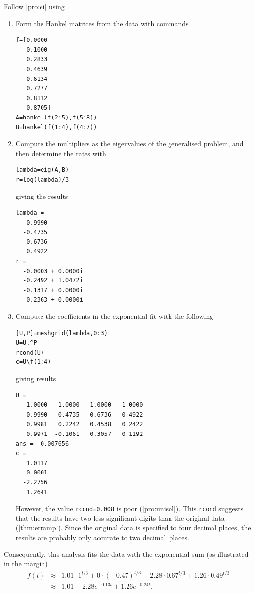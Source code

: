 \begin{draft}
\begin{example}
\begin{solution} 
Follow \autoref{pro:ei} using \script. 
\begin{enumerate}
\item Form the Hankel matrices from the data with commands
\begin{verbatim}
f=[0.0000
   0.1000
   0.2833
   0.4639
   0.6134
   0.7277
   0.8112
   0.8705]
A=hankel(f(2:5),f(5:8))
B=hankel(f(1:4),f(4:7))
\end{verbatim}
\setbox\ajrqrbox\hbox{}%
\marginpar{\usebox{\ajrqrbox}}%

\item Compute the multipliers as the eigenvalues of the generalised problem, and then determine the rates with
\begin{verbatim}
lambda=eig(A,B)
r=log(lambda)/3
\end{verbatim}
giving the results
\begin{verbatim}
lambda =
   0.9990
  -0.4735
   0.6736
   0.4922
r =
  -0.0003 + 0.0000i
  -0.2492 + 1.0472i
  -0.1317 + 0.0000i
  -0.2363 + 0.0000i
\end{verbatim}

\item Compute the coefficients in the exponential fit with the following
\begin{verbatim}
[U,P]=meshgrid(lambda,0:3)
U=U.^P
rcond(U)
c=U\f(1:4)
\end{verbatim}
giving results
\begin{verbatim}
U =
   1.0000   1.0000   1.0000   1.0000
   0.9990  -0.4735   0.6736   0.4922
   0.9981   0.2242   0.4538   0.2422
   0.9971  -0.1061   0.3057   0.1192
ans =  0.007656
c =
   1.0117
  -0.0001
  -2.2756
   1.2641
\end{verbatim}
However, the value \verb|rcond=0.008| is poor (\autoref{pro:unisol}).
This \verb|rcond| suggests that the results have two less significant digits than the original data (\autoref{thm:erramp}).
Since the original data is specified to four decimal places, the results are probably only accurate to two decimal~places.
\end{enumerate}
Consequently, this analysis fits the data with the exponential sum (as illustrated in the margin)
%
\begin{eqnarray*}
f(t)&\approx&1.01\cdot1^{t/3}+0\cdot(-0.47)^{t/3}
-2.28\cdot0.67^{t/3}+1.26\cdot0.49^{t/3}
\\&\approx&1.01-2.28e^{-0.13t}+1.26e^{-0.24t}.
\end{eqnarray*}
\end{solution}
\end{example}



\end{draft}
